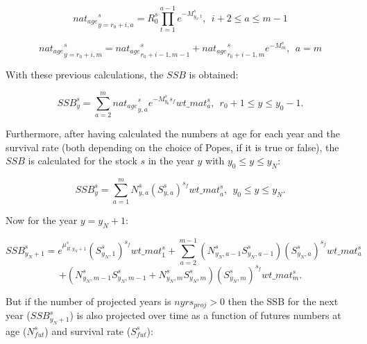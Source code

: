 \documentclass{article}
\begin{document}
\begin{equation}
{nat_{age}}_{y=r_0+i,a}^s=R^s_0\prod_{t=1}^{a-1}e^{-M^s_{y_0,t}}, \ \ i+2\leq  a \leq m-1
\end{equation}

\begin{equation}
{nat_{age}}_{y=r_0+i,m}^s={nat_{age}}_{r_0+i-1,m-1}^s
+{nat_{age}}_{r_0+i-1,m}^s e^{-M^s_{m}}, \ \ a=m
\end{equation}

With these previous calculations, the $SSB$ is obtained:

\begin{equation}
    SSB^s_y=\sum_{a=2}^{m}{nat_{age}}_{y,a}^s e^{-M^s_{y_0}s_f} wt\_{mat}^s_a, \ \ r_0 + 1 \leq y \leq y_0 - 1.
\end{equation}

Furthermore, after having calculated the numbers at age for each year and the survival rate (both depending on the choice of Popes, if it is true or false), the $SSB$ is calculated for the stock $s$ in the year $y$ with $y_0 \leq y \leq y_N$:

\begin{equation} \label{eq: ssb}
SSB^s_y=\sum_{a=1}^{m}N^s_{y,a}{(S^s_{y,a})}^{s_f}{wt\_{mat}}^s_a, \ \ y_0 \leq y \leq y_N.
\end{equation}



Now for the year $y=y_N+1$:

\begin{equation}
    SSB^s_{y_N+1}=e^{\mu^s_{R,y_N+1}}(S^{s}_{y_N,1})^{s_f}{wt\_{mat}}^s_1+\sum_{a=2}^{m-1}(N^{s}_{y_N,a-1}S^{s}_{y_N,a-1})(S^s_{y_N,a})^{s_f}wt\_{mat}^s_a
\end{equation}
\begin{equation*}
 +(N^{s}_{y_N,m-1}S^s_{y_N,m-1}+N^s_{y_N,m}S^s_{y_N,m})(S^s_{y_N,m})^{s_f}wt\_{mat}^s_{m}.
\end{equation*}

But if the number of projected years is $nyrs_{proj}>0$ then the SSB for the next year ($SSB^s_{y_N+1}$) is also projected over time as a function of futures numbers at age ($N^s_{fut}$) and survival rate ($S^s_{fut}$): 
\end{document}
